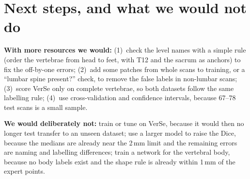 \documentclass[10pt,a4paper]{article}
\begin{document}
\section{Next steps, and what we would not do}
\textbf{With more resources we would:}
(1)~check the level names with a simple rule (order the vertebrae from head to feet, with T12 and the sacrum as anchors) to fix the off-by-one errors;
(2)~add some patches from whole scans to training, or a ``lumbar spine present?'' check, to remove the false labels in non-lumbar scans;
(3)~score VerSe only on complete vertebrae, so both datasets follow the same labelling rule;
(4)~use cross-validation and confidence intervals, because 67--78 test scans is a small sample.

\textbf{We would deliberately not:}
train or tune on VerSe, because it would then no longer test transfer to an unseen dataset;
use a larger model to raise the Dice, because the medians are already near the 2\,mm limit and the remaining errors are naming and labelling differences;
train a network for the vertebral body, because no body labels exist and the shape rule is already within 1\,mm of the expert points.
\end{document}
